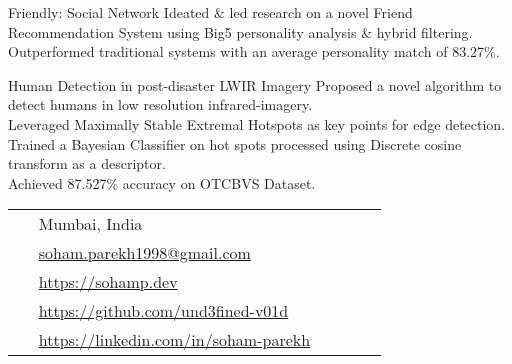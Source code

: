 \documentclass[10pt]{article} %
\begin{document}
\begin{paracol}{2}
{}
{}
{Friendly: Social Network} %
{
\textbullet{} Ideated \& led research on a novel Friend Recommendation System using Big5 personality analysis \& hybrid filtering. \\
\textbullet{} Outperformed traditional systems with an average personality match of 83.27\%.
} %

{}
{}
{Human Detection in post-disaster LWIR Imagery} %
{
\textbullet{} Proposed a novel algorithm to detect humans in low resolution infrared-imagery. \\
\textbullet{} Leveraged Maximally Stable Extremal Hotspots as key points for edge detection. \\
\textbullet{} Trained a Bayesian Classifier on hot spots processed using Discrete cosine transform as a descriptor. \\
\textbullet{} Achieved  87.527\% accuracy on OTCBVS Dataset.
} %

\vspace{-\baselineskip}\medskip %

\switchcolumn %


\parbox[top][0.10\textheight][c]{\linewidth}{ %
	\vspace{-0.04\textheight} %
	\colorbox{shade}{ %
		\begin{supertabular}{p{0.05\linewidth}|p{0.775\linewidth}} %
			\raisebox{-1pt}{\faHome} & Mumbai, India \\ %
			\raisebox{0pt}{\small\faEnvelope} & \href{mailto:soham.parekh1998@gmail.com}{soham.parekh1998@gmail.com} \\ %
			\raisebox{-1pt}{\small\faDesktop} & \href{https://sohamp.dev}{https://sohamp.dev} \\ %
			\raisebox{-1pt}{\faGithub} & \href{https://github.com/und3fined-v01d}{https://github.com/und3fined-v01d} \\ %
			\raisebox{-1pt}{\faLinkedinSquare} & \href{https://linkedin.com/in/soham-parekh}{https://linkedin.com/in/soham-parekh} \\ %
		\end{supertabular}
	}
}


\end{paracol}
\end{document}
